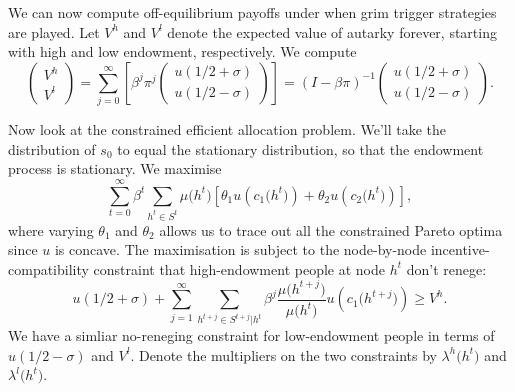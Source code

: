 \documentclass[11pt,letterpaper,reqno,oneside]{article}
\begin{document}
We can now compute off-equilibrium payoffs under when grim trigger strategies are played. Let $V^h$ and $V^l$ denote the expected value of autarky forever, starting with high and low endowment, respectively. We compute
%
\begin{equation*}
	\begin{pmatrix}
		V^h \\ V^l
	\end{pmatrix}
	=
	\sum_{j=0}^\infty
	\left[ \beta^j \pi^j
	\begin{pmatrix}
		u(1/2+\sigma) \\ u(1/2-\sigma)
	\end{pmatrix}
	\right]
	= \left( I - \beta \pi \right)^{-1}
	\begin{pmatrix}
		u(1/2+\sigma) \\ u(1/2-\sigma)
	\end{pmatrix} .
\end{equation*}

Now look at the constrained efficient allocation problem. We'll take the distribution of $s_0$ to equal the stationary distribution, so that the endowment process is stationary. We maximise
%
\begin{equation*}
	\sum_{t=0}^\infty \beta^t \sum_{h^t \in S^t}
	\mu\bigl(h^t\bigr) 
	\left[ \theta_1 u\left( c_1\bigl(h^t\bigr) \right) 
	+ \theta_2 u\left( c_2\bigl(h^t\bigr) \right) \right] ,
\end{equation*}
%
where varying $\theta_1$ and $\theta_2$ allows us to trace out all the constrained Pareto optima since $u$ is concave. The maximisation is subject to the node-by-node incentive-compatibility constraint that high-endowment people at node $h^t$ don't renege:
%
\begin{equation*}
	u(1/2+\sigma) 
	+ \sum_{j=1}^\infty \sum_{h^{t+j} \in S^{t+j} | h^t}
	\beta^j \frac{\mu\bigl(h^{t+j}\bigr)}{\mu\bigl(h^t\bigr)
	} u\left( c_1\bigl(h^{t+j}\bigr) \right) \geq V^h .
\end{equation*}
%
We have a simliar no-reneging constraint for low-endowment people in terms of $u(1/2-\sigma)$ and $V^l$. Denote the multipliers on the two constraints by $\lambda^h\bigl(h^t\bigr)$ and $\lambda^l\bigl(h^t\bigr)$.
\end{document}
